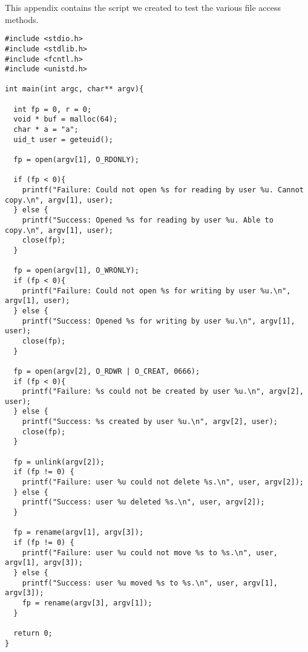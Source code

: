 \label{app:A}



This appendix contains the script we created to test the various file access methods.
\selectfont
\begin{lstlisting}[style=CStyle]
#include <stdio.h>
#include <stdlib.h>
#include <fcntl.h>
#include <unistd.h>

int main(int argc, char** argv){

  int fp = 0, r = 0;
  void * buf = malloc(64);
  char * a = "a";
  uid_t user = geteuid();
 
  fp = open(argv[1], O_RDONLY);
  
  if (fp < 0){
    printf("Failure: Could not open %s for reading by user %u. Cannot copy.\n", argv[1], user);
  } else {
    printf("Success: Opened %s for reading by user %u. Able to copy.\n", argv[1], user);
    close(fp);
  }
  
  fp = open(argv[1], O_WRONLY);
  if (fp < 0){
    printf("Failure: Could not open %s for writing by user %u.\n", argv[1], user);
  } else {
    printf("Success: Opened %s for writing by user %u.\n", argv[1], user);
    close(fp);
  }
  
  fp = open(argv[2], O_RDWR | O_CREAT, 0666);
  if (fp < 0){
    printf("Failure: %s could not be created by user %u.\n", argv[2], user);
  } else {
    printf("Success: %s created by user %u.\n", argv[2], user);
    close(fp);
  }
  
  fp = unlink(argv[2]);
  if (fp != 0) {
    printf("Failure: user %u could not delete %s.\n", user, argv[2]);
  } else {
    printf("Success: user %u deleted %s.\n", user, argv[2]);
  }

  fp = rename(argv[1], argv[3]);
  if (fp != 0) {
    printf("Failure: user %u could not move %s to %s.\n", user, argv[1], argv[3]);
  } else {
    printf("Success: user %u moved %s to %s.\n", user, argv[1], argv[3]);
    fp = rename(argv[3], argv[1]);
  }

  return 0;
}

\end{lstlisting}
\selectfont